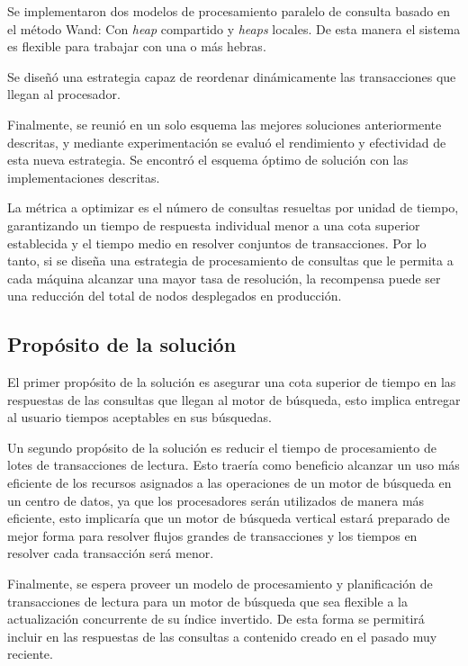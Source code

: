 Se implementaron dos modelos de procesamiento paralelo de consulta basado en el método Wand: Con \textit{heap} compartido y \textit{heaps} locales. De esta manera el sistema es flexible para trabajar con una o más hebras.

Se diseñó una estrategia capaz de reordenar dinámicamente las transacciones que llegan al procesador. 

Finalmente, se reunió en un solo esquema las mejores soluciones anteriormente descritas, y mediante experimentación se evaluó el rendimiento y efectividad de esta nueva estrategia. Se encontró el esquema óptimo de solución con las implementaciones descritas.

La métrica a optimizar es el número de consultas resueltas por unidad de tiempo, garantizando un tiempo de respuesta individual menor a una cota superior establecida y el tiempo medio en resolver conjuntos de transacciones. Por lo tanto, si se diseña una estrategia de procesamiento de consultas que le permita a cada máquina alcanzar una mayor tasa de resolución, la recompensa puede ser una reducción del total de nodos desplegados en producción.


\subsection{Prop\'osito de la solución}
\label{intro:propositosolucion}

El primer propósito de la solución es asegurar una cota superior de tiempo en las respuestas de las consultas que llegan al motor de búsqueda, esto implica entregar al usuario tiempos aceptables en sus búsquedas.

Un segundo propósito de la solución es reducir el tiempo de procesamiento de lotes de transacciones de lectura. Esto traería como beneficio alcanzar un uso más eficiente de los recursos asignados a las operaciones de un motor de búsqueda en un centro de datos, ya que los procesadores serán utilizados de manera más eficiente, esto implicaría que un motor de búsqueda vertical estará preparado de mejor forma para resolver flujos grandes de transacciones y los tiempos en resolver cada transacción será menor.

Finalmente, se espera proveer un modelo de procesamiento y planificación de transacciones de lectura para un motor de búsqueda que sea flexible a la actualización concurrente de su índice invertido. De esta forma se permitirá incluir en las respuestas de las consultas a contenido creado en el pasado muy reciente.

